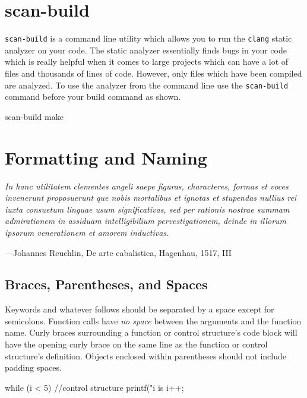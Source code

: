 \documentclass[11pt]{article}
\begin{document}
\section{scan-build}

\texttt{scan-build} is a command line utility which allows you to run the \texttt{clang} static analyzer on your code.
The static analyzer essentially finds bugs in your code which is really helpful when it comes to large projects
which can have a lot of files and thousands of lines of code. However, only files which have been compiled are
analyzed. To use the analyzer from the command line use the \texttt{scan-build} command before your build command
as shown.

\begin{codelisting}{}
scan-build make
\end{codelisting}


\section{Formatting and Naming}

\textwidth
\epigraph{\emph{
In hanc utilitatem clementes angeli saepe figuras, characteres, formas et voces
invenerunt proposuerunt que nobis mortalibus et ignotas et stupendas nullius rei
iuxta consuetum linguae usum significativas, sed per rationis nostrae summam
admirationem in assiduam intelligibilium pervestigationem, deinde in illorum
ipsorum venerationem et amorem inductivas.}}{---Johannes Reuchlin, De arte
cabalistica, Hagenhau, 1517, III}


\subsection{Braces, Parentheses, and Spaces}

Keywords and whatever follows should be separated by a space except for
semicolons. Function calls have \emph{no space} between
the arguments and the function name.
Curly braces surrounding a function or control structure's code block will have
the opening curly brace on the same line as the function or control structure's
definition. Objects enclosed within parentheses should not include padding spaces.

\begin{codelisting}{}
while (i < 5) {           //control structure
    printf("i is %
    i++;
}
\end{codelisting}
\end{document}
